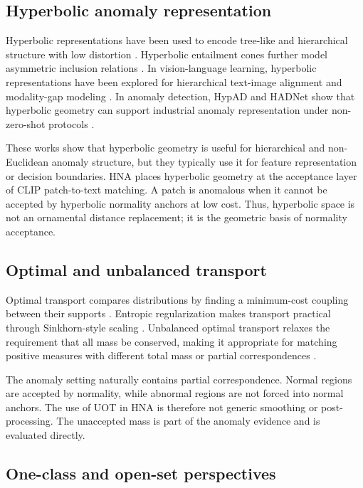 \documentclass[10pt]{article}
\newcommand{\method}{HNA}
\begin{document}
\subsection{Hyperbolic anomaly representation}

Hyperbolic representations have been used to encode tree-like and hierarchical structure with low distortion \cite{nickel2017poincare,ganea2018hnn}.
Hyperbolic entailment cones further model asymmetric inclusion relations \cite{ganea2018entailment}.
In vision-language learning, hyperbolic representations have been explored for hierarchical text-image alignment and modality-gap modeling \cite{desai2023meru,ramasinghe2024modalitygap}.
In anomaly detection, HypAD and HADNet show that hyperbolic geometry can support industrial anomaly representation under non-zero-shot protocols \cite{li2024hypad,hadnet2025}.

These works show that hyperbolic geometry is useful for hierarchical and non-Euclidean anomaly structure, but they typically use it for feature representation or decision boundaries.
\method{} places hyperbolic geometry at the acceptance layer of CLIP patch-to-text matching.
A patch is anomalous when it cannot be accepted by hyperbolic normality anchors at low cost.
Thus, hyperbolic space is not an ornamental distance replacement; it is the geometric basis of normality acceptance.

\subsection{Optimal and unbalanced transport}

Optimal transport compares distributions by finding a minimum-cost coupling between their supports \cite{peyre2019ot}.
Entropic regularization makes transport practical through Sinkhorn-style scaling \cite{cuturi2013sinkhorn}.
Unbalanced optimal transport relaxes the requirement that all mass be conserved, making it appropriate for matching positive measures with different total mass or partial correspondences \cite{chizat2018uot}.

The anomaly setting naturally contains partial correspondence.
Normal regions are accepted by normality, while abnormal regions are not forced into normal anchors.
The use of UOT in \method{} is therefore not generic smoothing or post-processing.
The unaccepted mass is part of the anomaly evidence and is evaluated directly.

\subsection{One-class and open-set perspectives}
\end{document}
